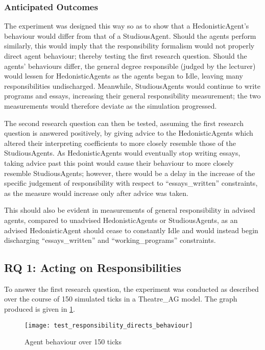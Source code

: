 \subsubsection{Anticipated Outcomes}

The experiment was designed this way so as to show that a HedonisticAgent's behaviour would differ from that of a StudiousAgent. Should the agents perform similarly, this would imply that the responsibility formalism would not properly direct agent behaviour; thereby testing the first research question. Should the agents' behaviours differ, the general degree responsible (judged by the lecturer) would lessen for HedonisticAgents as the agents began to Idle, leaving many responsibilities undischarged. Meanwhile, StudiousAgents would continue to write programs and essays, increasing their general responsibility measurement; the two measurements would therefore deviate as the simulation progressed.\par

The second research question can then be tested, assuming the first research question is answered positively, by giving advice to the HedonisticAgents which altered their interpreting coefficients to more closely resemble those of the StudiousAgents. As HedonisticAgents would eventually stop writing essays, taking advice past this point would cause their behaviour to more closely resemble StudiousAgents; however, there would be a delay in the increase of the specific judgement of responsibility with respect to ``essays\_written'' constraints, as the measure would increase only after advice was taken.\par

This should also be evident in measurements of general responsibility in advised agents, compared to unadvised HedonisticAgents or StudiousAgents, as an advised HedonisticAgent should cease to constantly Idle and would instead begin discharging ``essays\_written'' and ``working\_programs'' constraints.\par

\subsection{RQ 1: Acting on Responsibilities}
To answer the first research question, the experiment was conducted as described over the course of 150 simulated ticks in a Theatre\_AG model. The graph produced is given in \cref{fig:1}.

\begin{figure}[h]
    \centering
    \texttt{[image: test\_responsibility\_directs\_behaviour]}
    \caption{Agent behaviour over 150 ticks}
    \label{fig:1}
\end{figure}

